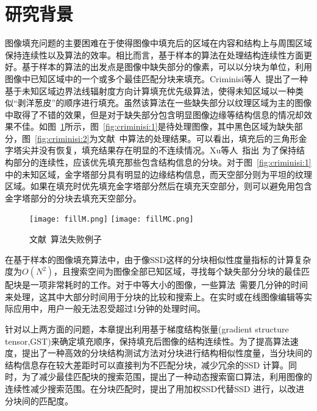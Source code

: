  \section{研究背景}
 \label{ch3:sec:background}
 图像填充问题的主要困难在于使得图像中填充后的区域在内容和结构上与周围区域保持连续性以及算法的效率。相比而言，基于样本的算法在处理结构连续性方面更好。基于样本的算法的出发点是图像中缺失部分的像素，可以以分块为单位，利用图像中已知区域中的一个或多个最佳匹配分块来填充。Criminisi等人~\cite{Criminisi04regionfilling}提出了一种基于未知区域边界法线辐射度方向计算填充优先级算法，使得未知区域以一种类似``剥洋葱皮''的顺序进行填充。虽然该算法在一些缺失部分以纹理区域为主的图像中取得了不错的效果，但是对于缺失部分包含明显图像边缘等结构信息的情况却效果不佳。如图~\ref{fig:criminisi}所示，图~\ref{fig:criminisi:1}是待处理图像，其中黑色区域为缺失部分，图~\ref{fig:criminisi:2}为文献~中算法的处理结果。可以看出，填充后的三角形金字塔尖并没有恢复，填充结果存在明显的不连续情况。Xu等人~\cite{Xu:2010}指出 为了保持结构部分的连续性，应该优先填充那些包含结构信息的分块。对于图~\ref{fig:criminisi:1}中的未知区域，金字塔部分具有明显的边缘结构信息，而天空部分则为平坦的纹理区域。如果在填充时优先填充金字塔部分然后在填充天空部分，则可以避免用包含金字塔部分的分块去填充天空部分。\par
 \begin{figure}[htb]
   \centering%
     {\texttt{[image: fillM.png]}}%
  \hspace{1em}%
       {\texttt{[image: fillMC.png]}}
   \caption{文献~算法失败例子}
   \label{fig:criminisi}
 \end{figure}
 在基于样本的图像填充算法中，由于像SSD这样的分块相似性度量指标的计算复杂度为$O(N^2)$，且搜索空间为图像全部已知区域，寻找每个缺失部分分块的最佳匹配块是一项非常耗时的工作。对于中等大小的图像，一些算法~\cite{Xu:2010}需要几分钟的时间来处理，这其中大部分时间用于分块的比较和搜索上。在实时或在线图像编辑等实际应用中，用户一般无法忍受超过1分钟的处理时间。\par
 针对以上两方面的问题，本章提出利用基于梯度结构张量(gradient structure tensor,GST)来确定填充顺序，保持填充后图像的结构连续性。为了提高算法速度，提出了一种高效的分块结构测试方法对分块进行结构相似性度量，当分块间的结构信息存在较大差距时可以直接判为不匹配分块，减少冗余的SSD 计算。同时，为了减少最佳匹配块的搜索范围，提出了一种动态搜索窗口算法，利用图像的连续性减少搜索范围。在分块匹配时，提出了用加权SSD代替SSD 进行，以改进分块间的匹配度。
